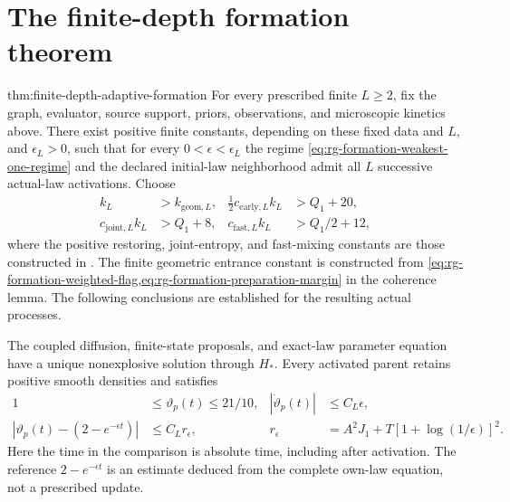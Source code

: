 \section{The finite-depth formation theorem}
\label{sec:rg-formation-theorem}

{thm:finite-depth-adaptive-formation}
For every prescribed finite \(L\ge2\), fix the graph, evaluator,
source support, priors, observations, and microscopic kinetics above.
There exist positive finite constants, depending on these fixed data
and \(L\), and \(\epsilon_L>0\), such that for every
\(0<\epsilon<\epsilon_L\) the regime
\cref{eq:rg-formation-weakest-one-regime} and the declared initial-law
neighborhood admit all \(L\) successive actual-law activations.
Choose
\begin{equation}
\begin{aligned}
k_L&>k_{\mathrm{geom},L},&
\tfrac12c_{\mathrm{early},L}k_L&>Q_1+20,\\
c_{\mathrm{joint},L}k_L&>Q_1+8,&
c_{\mathrm{fast},L}k_L&>Q_1/2+12,
\end{aligned}
\label{eq:rg-formation-common-entrance}
\end{equation}
where the positive restoring, joint-entropy, and fast-mixing constants
are those constructed in
.
The finite geometric entrance constant is constructed from
\cref{eq:rg-formation-weighted-flag,eq:rg-formation-preparation-margin}
in the coherence lemma. The following conclusions are established
for the resulting actual processes. 

The coupled diffusion, finite-state proposals, and exact-law parameter
equation have a unique nonexplosive solution through \(H_*\).
Every activated parent retains positive smooth densities and satisfies
\begin{equation}
\begin{aligned}
1&\le\vartheta_p(t)\le21/10,&
|\dot\vartheta_p(t)|&\le C_L\epsilon,\\
|\vartheta_p(t)-(2-e^{-\epsilon t})|
 &\le C_Lr_\epsilon,&
r_\epsilon&=A^2J_1+
       T[1+\log(1/\epsilon)]^2.
\end{aligned}
\label{eq:rg-formation-parameter-bound}
\end{equation}
Here the time in the comparison is absolute time, including after
activation. The reference \(2-e^{-\epsilon t}\) is an estimate
deduced from the complete own-law equation, not a prescribed update.

